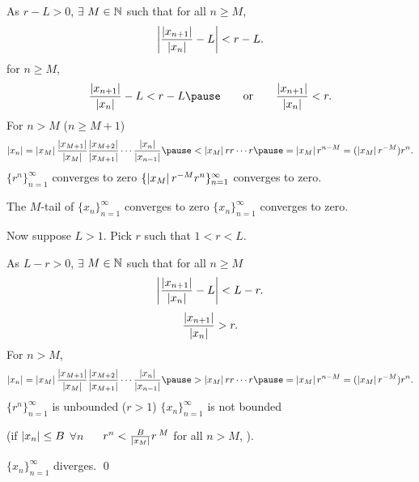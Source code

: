 \documentclass[10pt,aspectratio=149]{beamer}
\begin{document}
\begin{frame}
As $r-L > 0$, $\exists$ $M \in {\mathbb{N}}$ such that for
all $n \geq M$,
\begin{equation*}
\left\lvert {\frac{\left\lvert {x_{n+1}} \right\rvert}{\left\lvert {x_n} \right\rvert} - L} \right\rvert < r-L .
\end{equation*}
\pause
\thus \quad for $n \geq M$,
\begin{equation*}
\frac{\abs{x_{n+1}}}{\abs{x_n}} - L < r-L 
\pause
\qquad \text{or} \qquad
\frac{\abs{x_{n+1}}}{\abs{x_n}} < r .
\end{equation*}
\pause
For $n > M$ ($n \geq M+1$)
\begin{equation*}
\abs{x_n} =
\abs{x_M}
\frac{\abs{x_{M+1}}}{\abs{x_{M}}}
\frac{\abs{x_{M+2}}}{\abs{x_{M+1}}}
\cdots
\frac{\abs{x_{n}}}{\abs{x_{n-1}}}
\pause
<
\abs{x_M}
r r \cdots r
\pause
= \abs{x_M} r^{n-M} = (\abs{x_M} r^{-M}) r^n .
\end{equation*}
\pause
$\{ r^n \}_{n=1}^\infty$ converges to zero
\pause
\wthus
$\{ \left\lvert {x_M} \right\rvert r^{-M} r^n \}_{n=1}^\infty$ converges to zero.
  
\pause
\medskip

The $M$-tail of $\{x_n\}_{n=1}^\infty$ converges to zero \wthus
$\{x_n\}_{n=1}^\infty$ converges to zero.

\end{frame}

\begin{frame}
Now suppose $L > 1$.
\pause
\quad
Pick $r$ such that $1 < r < L$.
 
\pause
\medskip

As $L-r > 0$,
$\exists$ $M \in {\mathbb{N}}$ such that for
all $n \geq M$
\begin{equation*}
\left\lvert {\frac{\left\lvert {x_{n+1}} \right\rvert}{\left\lvert {x_n} \right\rvert} - L} \right\rvert < L-r .
\end{equation*}
\pause
\thus
\begin{equation*}
\frac{\left\lvert {x_{n+1}} \right\rvert}{\left\lvert {x_n} \right\rvert} > r .
\end{equation*}
\pause
For $n > M$,
\begin{equation*}
\abs{x_n} =
\abs{x_M}
\frac{\abs{x_{M+1}}}{\abs{x_{M}}}
\frac{\abs{x_{M+2}}}{\abs{x_{M+1}}}
\cdots
\frac{\abs{x_{n}}}{\abs{x_{n-1}}}
\pause
>
\abs{x_M}
r r \cdots r
\pause
= \abs{x_M} r^{n-M} = (\abs{x_M} r^{-M}) r^n .
\end{equation*}
\pause
$\{ r^n \}_{n=1}^\infty$ is unbounded ($r > 1$)
\pause
\wthus
$\{x_n\}_{n=1}^\infty$ is not bounded

\pause
(if $\left\lvert {x_n} \right\rvert \leq B$ $\forall n$ ~\thus~
$r^n < \frac{B}{\left\lvert {x_M} \right\rvert} r^{\:M}$ for all $n > M$, \contradiction).

\pause
\medskip
\thus \quad $\{ x_n \}_{n=1}^\infty$ diverges.
\qed

\end{frame}
\end{document}
